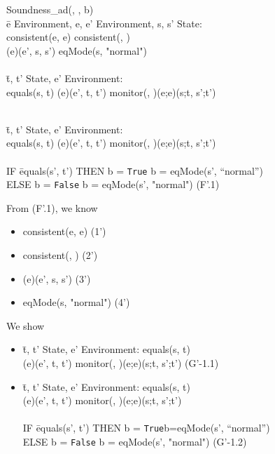 \documentclass[conference]{IEEEtran}
\begin{document}
\begin{tabbing}
Soundness\_ad(, , b) 
\\ \=e  Environment, e, e'  Environment, s, s'  State:
\\\>consistent(e, e)  consistent(, )  
\\\>\textlbrackdbl \textrbrackdbl(e)(e', s, s')  eqMode(s, "normal")
\\
\\\> \=t, t'  State, e'  Environment: 
\\\>\>equals(s, t)  \textlbrackdbl \textrbrackdbl(e)(e', t, t')  monitor(, )(e;e)(s;t, s';t')

\\\> \=t, t'  State, e'  Environment: 
\\\>\>equals(s, t)  \textlbrackdbl \textrbrackdbl(e)(e', t, t')  monitor(, )(e;e)(s;t, s';t')
\\\> \=
\\\>\>IF \=equals(s', t')  THEN b = \texttt{True}  b = eqMode(s', ``normal'')
\\\>\>ELSE b = \texttt{False}  b = eqMode(s', "normal")  \hspace*{1cm} (F'.1)
\end{tabbing}

\noindent From (F'.1), we know 

\begin{itemize}
\item consistent(e, e)  \hspace*{1.5cm}(1')
\item consistent(, )  \hspace*{1.6cm} (2')
\item \textlbrackdbl \textrbrackdbl(e)(e', s, s')   \hspace*{1.4cm} (3')
\item eqMode(s, "normal")   \hspace*{0.9cm} (4')
\end{itemize}

\noindent We show
\begin{itemize}
\item \begin{tabbing} \=t, t'  State, e'  Environment: equals(s, t)  
\\\>\textlbrackdbl \textrbrackdbl(e)(e', t, t')  monitor(, )(e;e)(s;t, s';t')  \hspace*{0.2cm} (G'-1.1)\end{tabbing}
\item \begin{tabbing} \=t, t'  State, e'  Environment: equals(s, t)  
\\\>\textlbrackdbl \textrbrackdbl(e)(e', t, t')  monitor(, )(e;e)(s;t, s';t')
\\\> \=
\\\>\>IF \=equals(s', t')  THEN b = \texttt{True}b=eqMode(s', ``normal'')
\\\>\>ELSE b = \texttt{False}  b = eqMode(s', "normal")   \hspace*{0.3cm} (G'-1.2) \end{tabbing}
 \end{itemize}
 
\end{document}
